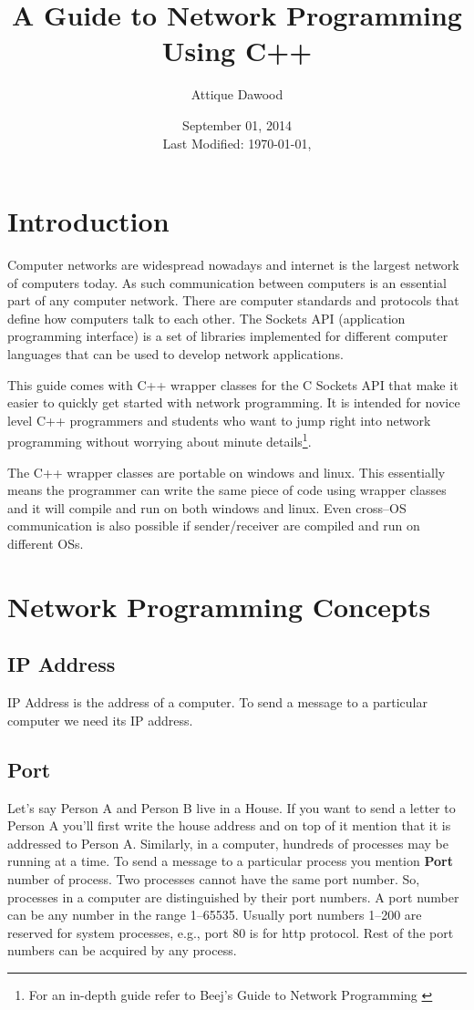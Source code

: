 \documentclass[12pt,a4paper]{article}
\title{\vspace{-2cm}A Guide to Network Programming Using C++}
\author{Attique Dawood}
\date{September 01, 2014\\[0.2cm] Last Modified: \today, \currenttime}
\begin{document}
\maketitle
\section{Introduction}
Computer networks are widespread nowadays and internet is the largest network of computers today. As such communication between computers is an essential part of any computer network. There are computer standards and protocols that define how computers talk to each other. The Sockets API (application programming interface) is a set of libraries implemented for different computer languages that can be used to develop network applications.

This guide comes with C++ wrapper classes for the C Sockets API that make it easier to quickly get started with network programming. It is intended for novice level C++ programmers and students who want to jump right into network programming without worrying about minute details\footnote{For an in-depth guide refer to Beej's Guide to Network Programming \cite{beej-ref}}.

The C++ wrapper classes are portable on windows and linux. This essentially means the programmer can write the same piece of code using wrapper classes and it will compile and run on both windows and linux. Even cross--OS communication is also possible if sender/receiver are compiled and run on different OSs.
\section{Network Programming Concepts}
\subsection{IP Address}
IP Address is the address of a computer. To send a message to a particular computer we need its IP address.
\subsection{Port}
Let's say Person A and Person B live in a House. If you want to send a letter to Person A you'll first write the house address and on top of it mention that it is addressed to Person A. Similarly, in a computer, hundreds of processes may be running at a time. To send a message to a particular process you mention \textbf{Port} number of process. Two processes cannot have the same port number. So, processes in a computer are distinguished by their port numbers. A port number can be any number in the range 1--65535. Usually port numbers 1--200 are reserved for system processes, e.g., port 80 is for http protocol. Rest of the port numbers can be acquired by any process.
\end{document}
